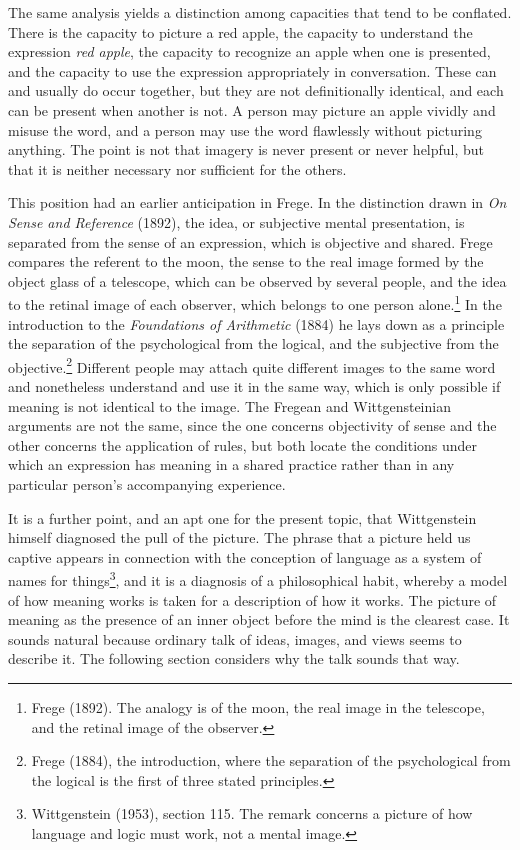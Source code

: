 \documentclass[11pt]{article}
\theoremstyle{remark}
\begin{document}
The same analysis yields a distinction among capacities that tend to be conflated. There is the capacity to picture a red apple, the capacity to understand the expression \emph{red apple}, the capacity to recognize an apple when one is presented, and the capacity to use the expression appropriately in conversation. These can and usually do occur together, but they are not definitionally identical, and each can be present when another is not. A person may picture an apple vividly and misuse the word, and a person may use the word flawlessly without picturing anything. The point is not that imagery is never present or never helpful, but that it is neither necessary nor sufficient for the others.

This position had an earlier anticipation in Frege. In the distinction drawn in \emph{On Sense and Reference} (1892), the idea, or subjective mental presentation, is separated from the sense of an expression, which is objective and shared. Frege compares the referent to the moon, the sense to the real image formed by the object glass of a telescope, which can be observed by several people, and the idea to the retinal image of each observer, which belongs to one person alone.\footnote{Frege (1892). The analogy is of the moon, the real image in the telescope, and the retinal image of the observer.} In the introduction to the \emph{Foundations of Arithmetic} (1884) he lays down as a principle the separation of the psychological from the logical, and the subjective from the objective.\footnote{Frege (1884), the introduction, where the separation of the psychological from the logical is the first of three stated principles.} Different people may attach quite different images to the same word and nonetheless understand and use it in the same way, which is only possible if meaning is not identical to the image. The Fregean and Wittgensteinian arguments are not the same, since the one concerns objectivity of sense and the other concerns the application of rules, but both locate the conditions under which an expression has meaning in a shared practice rather than in any particular person's accompanying experience.

It is a further point, and an apt one for the present topic, that Wittgenstein himself diagnosed the pull of the picture. The phrase that a picture held us captive appears in connection with the conception of language as a system of names for things\footnote{Wittgenstein (1953), section 115. The remark concerns a picture of how language and logic must work, not a mental image.}, and it is a diagnosis of a philosophical habit, whereby a model of how meaning works is taken for a description of how it works. The picture of meaning as the presence of an inner object before the mind is the clearest case. It sounds natural because ordinary talk of ideas, images, and views seems to describe it. The following section considers why the talk sounds that way.
\end{document}
